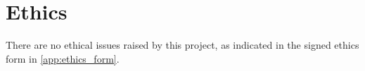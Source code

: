 \section{Ethics}
There are no ethical issues raised by this project, as indicated in the signed ethics form in \cref{app:ethics_form}.